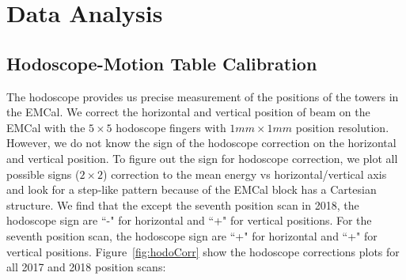 \documentclass[hidelinks,11pt]{article}
\numberwithin{figure}{section}
\numberwithin{table}{section}
\begin{document}




\section{Data Analysis}

\subsection{Hodoscope-Motion Table Calibration}

The hodoscope provides us precise measurement of the positions of the towers in the EMCal. We correct the horizontal and vertical position of beam on the EMCal with the $5 \times 5$ hodoscope fingers with $1 mm \times 1 mm$ position resolution. However, we do not know the sign of the hodoscope correction on the horizontal and vertical position. To figure out the sign for hodoscope correction, we plot all possible signs ($2 \times 2$) correction to the mean energy vs horizontal/vertical axis and look for a step-like pattern because of the EMCal block has a Cartesian structure. We find that the except the seventh position scan in 2018, the hodoscope sign are  ``-" for horizontal and ``+" for vertical positions. For the seventh position scan, the hodoscope sign are ``+" for horizontal and ``+" for vertical positions. Figure~\ref{fig:hodoCorr} show the hodoscope corrections plots for all 2017 and 2018 position scans:
\end{document}

